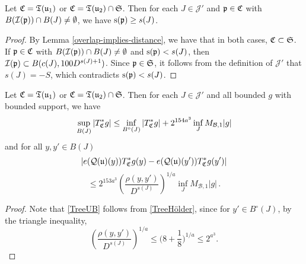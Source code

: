 {    \begin{lemma}
        \label{scales-impacting-interval}
        Let ${\mathfrak C} = {\mathfrak T}({\mathfrak u}_1)$ or ${\mathfrak C} = {\mathfrak T}({\mathfrak u}_2) \cap \mathfrak{S}$. Then for each $J \in \mathcal{J}'$ and ${\mathfrak p} \in {\mathfrak C}$ with $B({\mathcal{I}}({\mathfrak p})) \cap B(J) \neq \emptyset$, we have ${\mathrm{s}}({\mathfrak p}) \ge s(J)$.
    \end{lemma}

    \begin{proof}
        By Lemma \ref{overlap-implies-distance}, we have that in both cases, ${\mathfrak C} \subset \mathfrak{S}$. If ${\mathfrak p} \in {\mathfrak C}$ with $B({\mathcal{I}}({\mathfrak p})) \cap B(J) \neq \emptyset$ and ${\mathrm{s}}({\mathfrak p}) < s(J)$, then ${\mathcal{I}}({\mathfrak p}) \subset B(c(J), 100 D^{s(J) + 1})$. Since ${\mathfrak p} \in \mathfrak{S}$, it follows from the definition of $\mathcal{J}'$ that $s(J) = -S$, which contradicts ${\mathrm{s}}({\mathfrak p}) < s(J)$.
    \end{proof}

    \begin{lemma}
        \label{global-tree-control-1}
        Let ${\mathfrak C} = {\mathfrak T}({\mathfrak u}_1)$ or ${\mathfrak C} = {\mathfrak T}({\mathfrak u}_2) \cap \mathfrak{S}$. Then for each $J \in \mathcal{J}'$ and all bounded $g$ with bounded support, we have
        \begin{align}
            \label{TreeUB}
            \sup_{B(J)} |T_{{\mathfrak C}}^*g| \leq \inf_{B^\circ{}(J)} |T^*_{{\mathfrak C}} g| + 2^{154a^3} \inf_{J} M_{\mathcal{B}, 1} |g|
        \end{align}
        and for all $y,y' \in B(J)$
        $$
            |e({\mathcal{Q}}({\mathfrak u})(y)) T_{{\mathfrak C}}^* g(y) - e({\mathcal{Q}}({\mathfrak u})(y')) T_{{\mathfrak C}}^* g(y')|
        $$
        \begin{equation}
            \label{TreeHölder}
             \le 2^{153a^3} \left(\frac{\rho(y,y')}{D^{s(J)}}\right)^{1/a} \inf_J M_{\mathcal{B},1} |g|\,.
        \end{equation}
    \end{lemma}

    \begin{proof}
        Note that \eqref{TreeUB} follows from \eqref{TreeHölder}, since for $y'\in B^\circ{}(J)$, by the triangle inequality,
        $$\left(\frac{\rho(y,y')}{D^{s(J)}}\right)^{1/a}\le \Big(8 + \frac{1}8\Big)^{1/a}\le 2^{a^3}.$$


\end{proof}}
